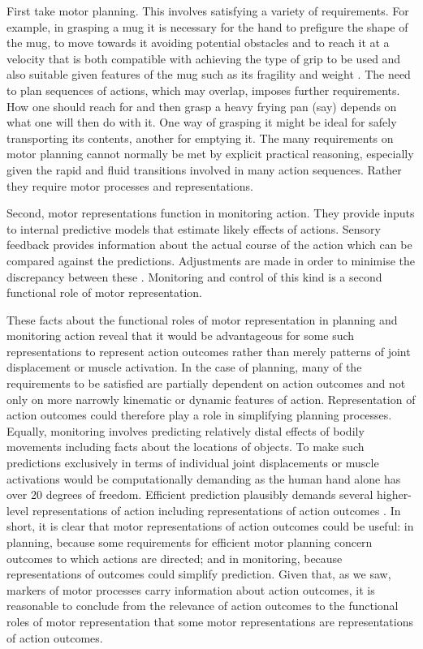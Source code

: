 \documentclass[12pt,\papersize]{extarticle}
\begin{document}
First take motor planning. This involves satisfying a variety of requirements. For example, in grasping a mug it is necessary for the hand to prefigure the shape of the mug, to move towards it avoiding potential obstacles and to reach it at a velocity that is both compatible with achieving the type of grip to be used and also suitable given features of the mug such as its fragility and weight \citep{Jeannerod:1995bb,jeannerod:1998nbo}. The need to plan sequences of actions, which may overlap, imposes further requirements. How one should reach for and then grasp a heavy frying pan (say) depends on what one will then do with it. One way of grasping it might be ideal for safely transporting its contents, another for emptying it. The many requirements on motor planning cannot normally be met by explicit practical reasoning, especially given the rapid and fluid transitions involved in many action sequences. Rather they require motor processes and representations.

Second, motor representations function in monitoring action. They provide inputs to internal predictive models that estimate likely effects of actions. Sensory feedback provides information about the actual course of the action which can be compared against the predictions. Adjustments are made in order to minimise the discrepancy between these \citep{wolpert:1995internal,miall:1996_forward}. Monitoring and control of this kind is a second functional role of motor representation.

These facts about the functional roles of motor representation in planning and monitoring action reveal that it would be advantageous for some such representations to represent action outcomes rather than merely patterns of joint displacement or muscle activation. In the case of planning, many of the requirements to be satisfied are partially dependent on action outcomes and not only on more narrowly kinematic or dynamic features of action. Representation of action outcomes could therefore play a role in simplifying planning processes.  Equally, monitoring involves predicting relatively distal effects of bodily movements including facts about the locations of objects. To make such predictions exclusively in terms of individual joint displacements or muscle activations would be computationally demanding as the human hand alone has over 20 degrees of freedom. Efficient prediction plausibly demands several higher-level representations of action including representations of action outcomes \citep{arbib:1985_coordinated,mason:2001_hand,santello:2002_patterns}. In short, it is clear that motor representations of action outcomes could be useful: in planning, because some requirements for efficient motor planning concern outcomes to which actions are directed; and in monitoring, because representations of outcomes could simplify prediction. Given that, as we saw, markers of motor processes carry information about action outcomes, it is reasonable to conclude from the relevance of action outcomes to the functional roles of motor representation that some motor representations are representations of action outcomes.
\end{document}
